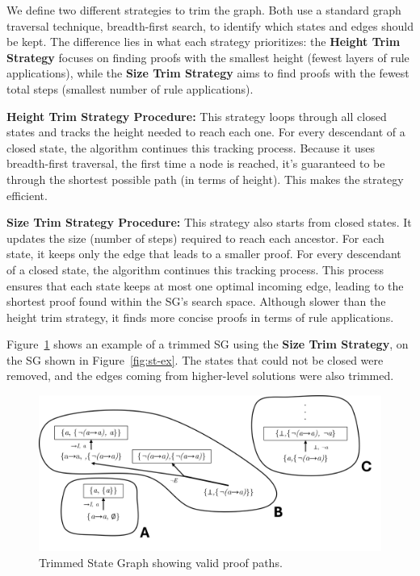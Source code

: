 \documentclass[runningheads]{llncs}
\begin{document}
We define two different strategies to trim the graph. Both use a standard graph traversal technique, breadth-first search, to identify which states and edges should be kept. The difference lies in what each strategy prioritizes: the \textbf{Height Trim Strategy} focuses on finding proofs with the smallest height (fewest layers of rule applications), while the \textbf{Size Trim Strategy} aims to find proofs with the fewest total steps (smallest number of rule applications).


\vspace{1em}
\textbf{Height Trim Strategy Procedure:}  
This strategy loops through all closed states and tracks the height needed to reach each one. For every descendant of a closed state, the algorithm continues this tracking process. Because it uses breadth-first traversal, the first time a node is reached, it’s guaranteed to be through the shortest possible path (in terms of height). This makes the strategy efficient.

\vspace{0.5em}
\textbf{Size Trim Strategy Procedure:}  
This strategy also starts from closed states. It updates the size (number of steps) required to reach each ancestor. For each state, it keeps only the edge that leads to a smaller proof. For every descendant
of a closed state, the algorithm continues this tracking process. This process ensures that each state keeps at most one optimal incoming edge, leading to the shortest proof found within the SG's search space. Although slower than the height trim strategy, it finds more concise proofs in terms of rule applications.

\vspace{1em}
Figure~\ref{fig:sg-trim} shows an example of a trimmed SG using the \textbf{Size Trim Strategy}, on the SG shown in Figure~\ref{fig:st-ex}. The states that could not be closed were removed, and the edges coming from higher-level solutions were also trimmed.


\vspace{-1em}
\begin{figure}
    \centering
    \includegraphics[width=1\linewidth]{resources/sg-final.png}
    \caption{Trimmed State Graph showing valid proof paths.}
    \label{fig:sg-trim}
\end{figure}
\vspace{-2em}
\end{document}
